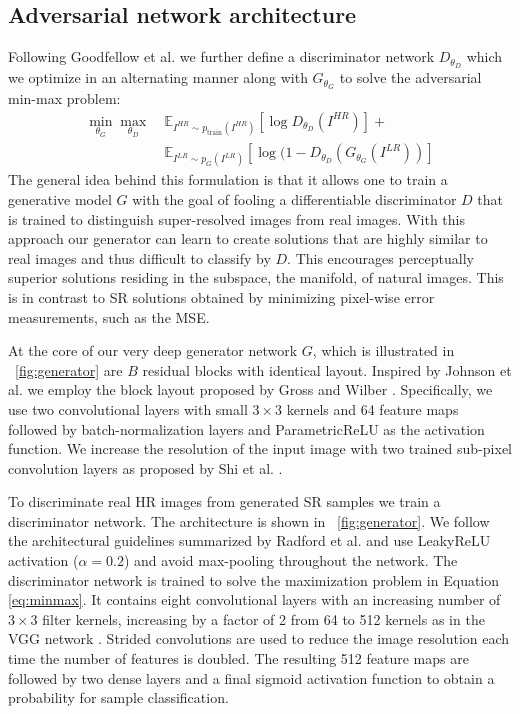 \documentclass[10pt,twocolumn,letterpaper]{article}
\begin{document}
\subsection{Adversarial network architecture}
Following Goodfellow et al. \cite{Goodfellow14GAN} we further define a discriminator network $D_{\theta_D}$ which we optimize in an alternating manner along with $G_{\theta_G}$ to solve the adversarial min-max problem: 
\begin{equation}
\label{eq:minmax}
\begin{split}
	\min_{\theta_G} \max_{\theta_D} ~& \mathbb{E}_{I^{HR}\sim p_\textrm{train}(I^{HR})} [ \log D_{\theta_D}(I^{HR}) ] + \\
	& \mathbb{E}_{I^{LR}\sim p_G(I^{LR})} [ \log (1-D_{\theta_D}(G_{\theta_G}(I^{LR})) ]
\end{split}
\end{equation}
The general idea behind this formulation is that it allows one to train a generative model $G$ with the goal of fooling a differentiable discriminator $D$ that is trained to distinguish super-resolved images from real images. 
With this approach our generator can learn to create solutions that are highly similar to real images and thus difficult to classify by $D$. This encourages perceptually superior solutions residing in the subspace, the manifold, of natural images. This is in contrast to \ac{SR} solutions obtained by minimizing pixel-wise error measurements, such as the \ac{MSE}.

At the core of our very deep generator network $G$, which is illustrated in \figurename~\ref{fig:generator} are $B$ residual blocks with identical layout. Inspired by Johnson et al. \cite{Johnson16PercepLoss} we employ the block layout proposed by Gross and Wilber \cite{gross2016}. Specifically, we use two convolutional layers with small $3\times3$ kernels and 64 feature maps followed by batch-normalization layers \cite{Ioffe2015} and ParametricReLU \cite{He2015relu} as the activation function.
We increase the resolution of the input image with two trained sub-pixel convolution layers as proposed by Shi et al. \cite{Shi2016ESPCN}.

To discriminate real \ac{HR} images from generated \ac{SR} samples we train a discriminator network. The architecture is shown in \figurename~\ref{fig:generator}.
	We follow the architectural guidelines summarized by Radford et al. \cite{Radford2015} and use LeakyReLU activation ($\alpha=0.2$) and avoid max-pooling throughout the network. The discriminator network is trained to solve the maximization problem in Equation \ref{eq:minmax}. It contains eight convolutional layers with an increasing number of $3\times3$ filter kernels, increasing by a factor of 2 from 64 to 512 kernels as in the VGG network \cite{simonyan2014very}. Strided convolutions are used to reduce the image resolution each time the number of features is doubled. The resulting 512 feature maps are followed by two dense layers and a final sigmoid activation function to obtain a probability for sample classification.
\end{document}
